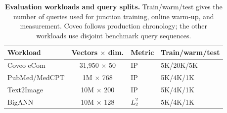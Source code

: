 \begin{table}[t]
\centering
\caption{\textbf{Evaluation workloads and query splits.} Train/warm/test gives the number of queries used for junction training, online warm-up, and measurement. Coveo follows production chronology; the other workloads use disjoint benchmark query sequences.}
\label{tab:eval-workloads}
\small
\setlength{\tabcolsep}{3pt}
\begin{tabular}{@{}lcll@{}}
\toprule
Workload & Vectors $\times$ dim. & Metric & Train/warm/test \\
\midrule
Coveo eCom & 31,950 $\times$ 50 & IP & 5K/20K/5K \\
PubMed/MedCPT & 1M $\times$ 768 & IP & 5K/4K/1K \\
Text2Image & 10M $\times$ 200 & IP & 5K/4K/1K \\
BigANN & 10M $\times$ 128 & $L_2^2$ & 5K/4K/1K \\
\bottomrule
\end{tabular}
\end{table}

